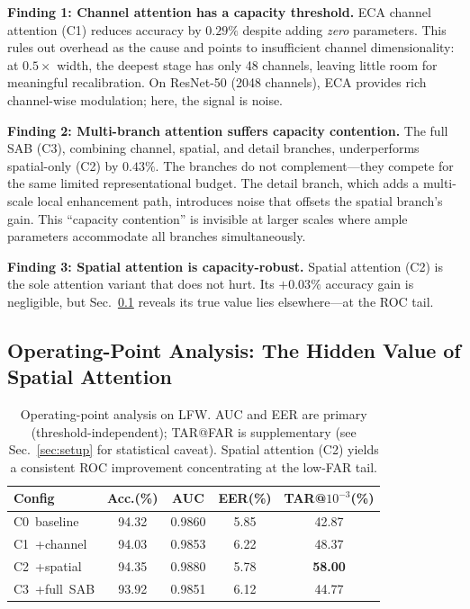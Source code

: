 \documentclass[journal,10pt]{IEEEtran}
\begin{document}
\textbf{Finding 1: Channel attention has a capacity threshold.} ECA channel attention (C1) reduces accuracy by $0.29\%$ despite adding \emph{zero} parameters. This rules out overhead as the cause and points to insufficient channel dimensionality: at $0.5{\times}$ width, the deepest stage has only 48 channels, leaving little room for meaningful recalibration. On ResNet-50 (2048 channels), ECA provides rich channel-wise modulation; here, the signal is noise.

\textbf{Finding 2: Multi-branch attention suffers capacity contention.} The full SAB (C3), combining channel, spatial, and detail branches, underperforms spatial-only (C2) by $0.43\%$. The branches do not complement---they compete for the same limited representational budget. The detail branch, which adds a multi-scale local enhancement path, introduces noise that offsets the spatial branch's gain. This ``capacity contention'' is invisible at larger scales where ample parameters accommodate all branches simultaneously.

\textbf{Finding 3: Spatial attention is capacity-robust.} Spatial attention (C2) is the sole attention variant that does not hurt. Its $+0.03\%$ accuracy gain is negligible, but Sec.~\ref{sec:oppoint} reveals its true value lies elsewhere---at the ROC tail.

\subsection{Operating-Point Analysis: The Hidden Value of Spatial Attention}
\label{sec:oppoint}

\begin{table}[h]
\centering
\caption{Operating-point analysis on LFW. AUC and EER are primary (threshold-independent); TAR@FAR is supplementary (see Sec.~\ref{sec:setup} for statistical caveat). Spatial attention (C2) yields a consistent ROC improvement concentrating at the low-FAR tail.}
\label{tab:tar}
\begin{tabular}{lcccc}
\toprule
Config & Acc.(\%) & AUC & EER(\%) & TAR@$10^{-3}$(\%) \\
\midrule
C0~baseline       & 94.32 & 0.9860 & 5.85 & 42.87 \\
C1~+channel       & 94.03 & 0.9853 & 6.22 & 48.37 \\
C2~+spatial       & 94.35 & 0.9880 & 5.78 & \textbf{58.00} \\
C3~+full~SAB      & 93.92 & 0.9851 & 6.12 & 44.77 \\
\bottomrule
\end{tabular}
\end{table}
\end{document}
